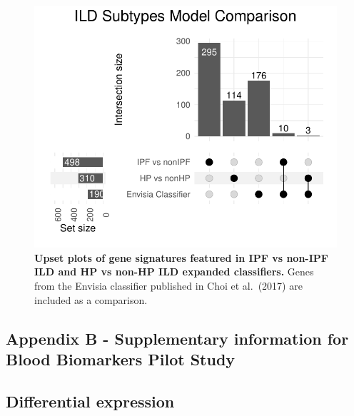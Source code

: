 \documentclass[
]{article}
\begin{document}
\begin{figure}

{\centering \includegraphics[width=0.6\linewidth,]{./Figures/SysReview/FigE10_Envisia} 

}

\caption[Envisia comparison]{\textbf{Upset plots of gene signatures featured in IPF vs non-IPF ILD and HP vs non-HP ILD expanded classifiers.} Genes from the Envisia classifier published in Choi et al.~(2017) are included as a comparison.}\label{fig:envisia}
\end{figure}

\clearpage

\hypertarget{appendix-b---supplementary-information-for-blood-biomarkers-pilot-study}{%
\subsection{Appendix B - Supplementary information for Blood Biomarkers Pilot Study}\label{appendix-b---supplementary-information-for-blood-biomarkers-pilot-study}}

\renewcommand{\thefigure}{A3.\arabic{figure}}
\setcounter{figure}{0}
\renewcommand{\thetable}{A3.\arabic{table}}
\setcounter{table}{0}
\renewcommand{\theequation}{A3.\arabic{equation}}
\setcounter{equation}{0}

\captionsetup{width=6.5in}

\hypertarget{differential-expression}{%
\subsection{Differential expression}\label{differential-expression}}
\end{document}
